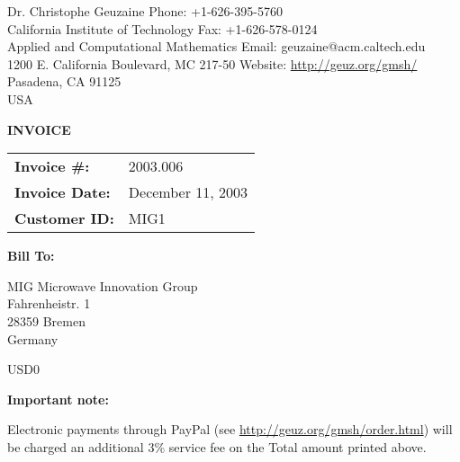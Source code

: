 \documentclass{article}
\begin{document}
Dr. Christophe Geuzaine \hfill Phone: +1-626-395-5760\\
California Institute of Technology \hfill Fax: +1-626-578-0124\\
Applied and Computational Mathematics \hfill Email: geuzaine@acm.caltech.edu\\
1200 E. California Boulevard, MC 217-50 \hfill Website: \url{http://geuz.org/gmsh/}\\
Pasadena, CA 91125 \\
USA

\vspace*{3em}

\begin{minipage}{0.5\textwidth}\centering
\textbf{\large INVOICE}
\end{minipage}%
\begin{minipage}{0.5\textwidth}\flushright
\begin{tabular}{|l|l|}
\hline
\textbf{Invoice \#:} & 2003.006\\
\textbf{Invoice Date:} & December 11, 2003\\
\textbf{Customer ID:} & MIG1\\
\hline
\end{tabular}
\end{minipage}

\vspace*{3em}

\textbf{Bill To:}\smallskip

MIG Microwave Innovation Group\\
Fahrenheistr. 1\\
28359 Bremen\\
Germany

\bigskip
\begin{invoice}{USD}{0}
\end{invoice}

\bigskip

\textbf{Important note:}\smallskip

Electronic payments through PayPal (see
\url{http://geuz.org/gmsh/order.html}) will be charged an additional 3\%
service fee on the Total amount printed above.
\end{document}

